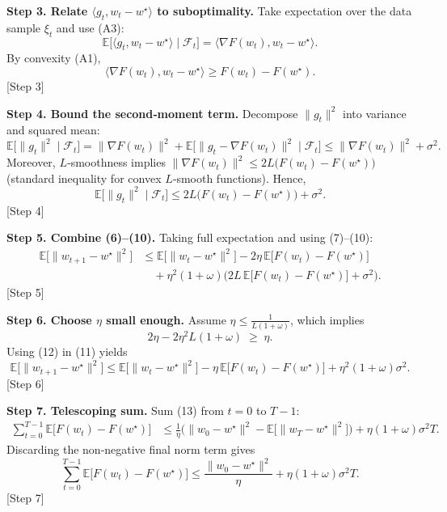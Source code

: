 \documentclass{article}
\begin{document}
\begin{lemma}
\noindent\textbf{Step 3. Relate $\langle g_t,w_t-w^\star\rangle$ to suboptimality.}  
Take expectation over the data sample $\xi_t$ and use (A3):
\[
\mathbb{E}\!\big[\langle g_t,w_t-w^\star\rangle\mid\mathcal{F}_t\big]
= \langle \nabla F(w_t), w_t-w^\star\rangle .
\tag{7}
\]
By convexity (A1),
\[
\langle \nabla F(w_t), w_t-w^\star\rangle
\ge F(w_t)-F(w^\star).
\tag{8}
\]
[Step 3]

\noindent\textbf{Step 4. Bound the second‑moment term.}  
Decompose $\|g_t\|^{2}$ into variance and squared mean:
\[
\mathbb{E}\!\big[\|g_t\|^{2}\mid\mathcal{F}_t\big]
= \|\nabla F(w_t)\|^{2}
+ \mathbb{E}\!\big[\|g_t-\nabla F(w_t)\|^{2}\mid\mathcal{F}_t\big]
\le \|\nabla F(w_t)\|^{2}+\sigma^{2}.
\tag{9}
\]
Moreover, $L$‑smoothness implies $\|\nabla F(w_t)\|^{2}\le 2L\big(F(w_t)-F(w^\star)\big)$
(standard inequality for convex $L$‑smooth functions). Hence,
\[
\mathbb{E}\!\big[\|g_t\|^{2}\mid\mathcal{F}_t\big]
\le 2L\big(F(w_t)-F(w^\star)\big)+\sigma^{2}.
\tag{10}
\]
[Step 4]

\noindent\textbf{Step 5. Combine (6)–(10).}  
Taking full expectation and using (7)–(10):
\[
\begin{aligned}
\mathbb{E}\!\big[\|w_{t+1}-w^\star\|^{2}\big]
&\le \mathbb{E}\!\big[\|w_t-w^\star\|^{2}\big]
-2\eta\,\mathbb{E}\!\big[F(w_t)-F(w^\star)\big] \\
&\quad +\eta^{2}(1+\omega)\Big(2L\,\mathbb{E}\!\big[F(w_t)-F(w^\star)\big]
      +\sigma^{2}\Big).
\end{aligned}
\tag{11}
\]
[Step 5]

\noindent\textbf{Step 6. Choose $\eta$ small enough.}  
Assume $\eta\le \frac{1}{L(1+\omega)}$, which implies
\[
2\eta - 2\eta^{2}L(1+\omega) \;\ge\; \eta .
\tag{12}
\]
Using (12) in (11) yields
\[
\mathbb{E}\!\big[\|w_{t+1}-w^\star\|^{2}\big]
\le \mathbb{E}\!\big[\|w_t-w^\star\|^{2}\big]
- \eta\,\mathbb{E}\!\big[F(w_t)-F(w^\star)\big]
+ \eta^{2}(1+\omega)\sigma^{2}.
\tag{13}
\]
[Step 6]

\noindent\textbf{Step 7. Telescoping sum.}  
Sum (13) from $t=0$ to $T-1$:
\[
\begin{aligned}
\sum_{t=0}^{T-1}\mathbb{E}\!\big[F(w_t)-F(w^\star)\big]
&\le \frac{1}{\eta}\Big(\|w_0-w^\star\|^{2}
      -\mathbb{E}\!\big[\|w_T-w^\star\|^{2}\big]\Big)
   + \eta(1+\omega)\sigma^{2} T .
\end{aligned}
\tag{14}
\]
Discarding the non‑negative final norm term gives
\[
\sum_{t=0}^{T-1}\mathbb{E}\!\big[F(w_t)-F(w^\star)\big]
\le \frac{\|w_0-w^\star\|^{2}}{\eta}
   + \eta(1+\omega)\sigma^{2}T .
\tag{15}
\]
[Step 7]


\end{lemma}
\end{document}
